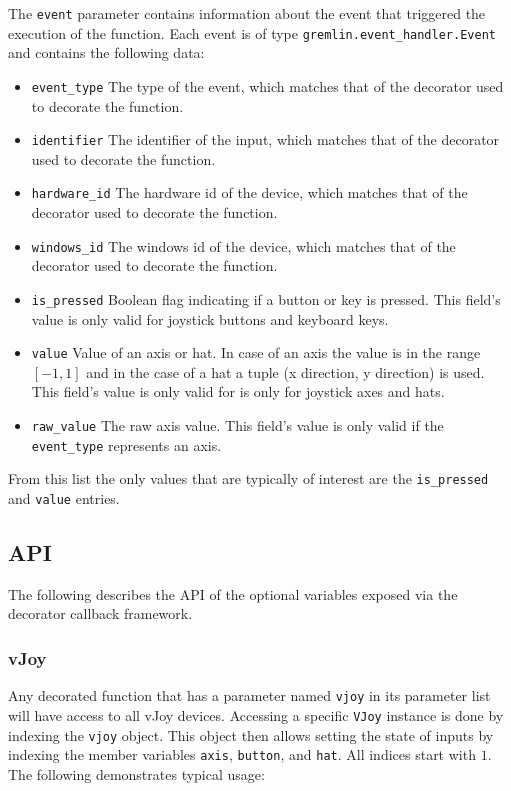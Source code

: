 \documentclass[a4, 10pt]{article}
\begin{document}
The \verb+event+ parameter contains information about the event that
triggered the execution of the function. Each event is of type
\verb+gremlin.event_handler.Event+ and contains the following data:

\begin{itemize}
    \item \verb+event_type+ The type of the event, which matches that
        of the decorator used to decorate the function.
    \item \verb+identifier+ The identifier of the input, which matches
        that of the decorator used to decorate the function.
    \item \verb+hardware_id+ The hardware id of the device, which
        matches that of the decorator used to decorate the function.
    \item \verb+windows_id+ The windows id of the device, which matches
        that of the decorator used to decorate the function.
    \item \verb+is_pressed+ Boolean flag indicating if a button or key
        is pressed. This field's value is only valid for joystick
        buttons and keyboard keys.
    \item \verb+value+ Value of an axis or hat. In case of an axis the
        value is in the range $\left[-1, 1\right]$ and in the case of a
        hat a tuple (x direction, y direction) is used. This field's
        value is only valid for is only for joystick axes and hats.
    \item \verb+raw_value+ The raw axis value. This field's value is
        only valid if the \verb+event_type+ represents an axis.
\end{itemize}

From this list the only values that are typically of interest are the
\verb+is_pressed+ and \verb+value+ entries.


\subsection{API}
\label{sec:cm_api}

The following describes the API of the optional variables exposed via
the decorator callback framework.


\subsubsection{vJoy}

Any decorated function that has a parameter named \verb+vjoy+ in its
parameter list will have access to all vJoy devices.  Accessing a
specific \verb+VJoy+ instance is done by indexing the \verb+vjoy+
object. This object then allows setting the state of inputs by indexing
the member variables \verb+axis+, \verb+button+, and \verb+hat+.  All
indices start with $1$. The following demonstrates typical usage:
\end{document}
